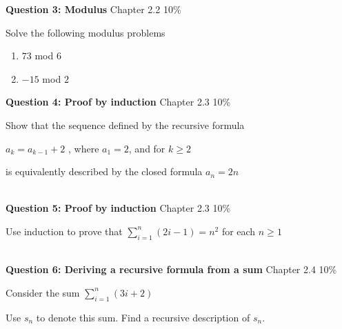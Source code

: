 \documentclass[a4paper,12pt]{book}
\begin{document}
\hrulefill

\textbf{Question 3: Modulus}
\hfill
Chapter 2.2
\hfill
10\%

Solve the following modulus problems

\begin{enumerate}	
	\item			$ 73 			$ mod $ 	6 $
	\item		$ -15  	$ mod $ 		2  $
\end{enumerate}

\hrulefill

\textbf{Question 4: Proof by induction}
\hfill
Chapter 2.3
\hfill
10\%

Show that the sequence defined by the recursive formula

\begin{center}
$ a_{k} = a_{k-1} + 2 $ , where $ a_{1} = 2 $, and for $ k \geq 2 $
\end{center}

is equivalently described by the closed formula \tab
$ a_{n} = 2n $

\newpage


~\\
\textbf{Question 5: Proof by induction}
\hfill
Chapter 2.3
\hfill
10\%

Use induction to prove that $ \sum_{i=1}^{n} (2i-1) = n^{2} $
for each $ n \geq 1 $

\hrulefill
~\\
\textbf{Question 6: Deriving a recursive formula from a sum}
\hfill
Chapter 2.4
\hfill
10\%

Consider the sum
$ \sum_{i=1}^{n} (3i + 2) $

Use $ s_{n} $ to denote this sum.
Find a recursive description of $ s_{n} $.
\end{document}
